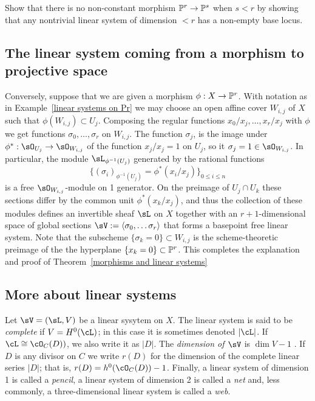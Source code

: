 \begin{exercise}\label{here there be basepoints}
 Show that there is no non-constant morphism $\PP^r\to \PP^s$ when $s<r$ by showing that any nontrivial linear
 system of dimension $<r$ has a non-empty base locus.
\end{exercise}

\subsection{The linear system coming from a morphism to projective space}

Conversely, suppose that we are given a morphism $\phi: X\to \PP^{r}$. With notation as in Example~\ref{linear systems on Pr} we may choose an open affine cover $W_{i,j}$ of $X$ such that $\phi(W_{i,j})\subset U_{j}$. Composing the regular
functions
$x_{0}/x_{j},\dots, x_{r}/x_{j}$ with $\phi$ we get functions $\sigma_{0},\dots,\sigma_{r}$ on $W_{i,j}$.  The function $\sigma_{j}$, is the image under $\phi^*: \sO_{U_j} \to \sO_{W_{i,j}}$ of the function $x_j/x_j = 1$ on $U_{j}$, so it $\sigma_j = 1\in \sO_{W_{i,j}}$. In particular, the module $\sL_{\phi^{-1}(U_j)}$ generated by the rational functions 
$$
\{(\sigma_i)_{\phi^{-1}(U_j)} = \phi^*(x_i/x_j)\}_{0\leq i\leq n}
$$
 is a free $\sO_{W_{i,j}}$-module on 1 generator. On the preimage of $U_j\cap U_k$ these sections differ by the common unit $\phi^*(x_k/x_j)$, and thus the collection of these modules defines an invertible sheaf $\sL$ on $X$ together with an
$r+1$-dimensional space of global sections $\sV := \langle \sigma_0,\dots \sigma_r\rangle$ that forms a basepoint free linear system. Note that the subscheme  $\{\sigma_k = 0\} \subset W_{i,j}$  is the scheme-theoretic preimage of the
the hyperplane $\{x_k = 0\}\subset \PP^r$. This completes the explanation and proof of Theorem~\ref{morphisms and linear systems}


\subsection{More about linear systems}

Let $\sV = (\sL, V)$ be a linear sysytem on $X$.  The linear system is said to be \emph{complete} if $V = H^0(\cL)$; in this case it is sometimes denoted $|\cL|$. If $\cL \cong \cO_C(D))$, we also write it as $|D|$. 
The \emph{dimension of $\sV$} is $\dim V -1$ . If $D$ is any divisor on $C$ we write $r(D)$ for the dimension of the complete linear series $|D|$; that is, $r(D) = h^0(\cO_C(D)) - 1$. Finally, a linear system of dimension 1 is called a \emph{pencil}, a linear system of dimension 2 is called a \emph{net} and, less commonly, a three-dimensional linear system is called a \emph{web}. 


